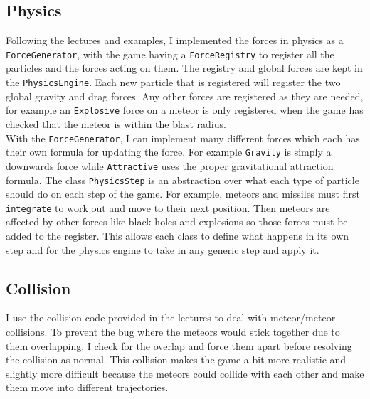 \documentclass{article}
\newcommand{\n}[0]{\\[\baselineskip]}
\begin{document}
\subsection{Physics}
Following the lectures and examples, I implemented the forces in physics as a \texttt{ForceGenerator}, with the game having a \texttt{ForceRegistry} to register all the particles and the forces acting on them. The registry and global forces are kept in the \texttt{PhysicsEngine}. Each new particle that is registered will register the two global gravity and drag forces. Any other forces are registered as they are needed, for example an \texttt{Explosive} force on a meteor is only registered when the game has checked that the meteor is within the blast radius. 
\n
With the \texttt{ForceGenerator}, I can implement many different forces which each has their own formula for updating the force. For example \texttt{Gravity} is simply a downwards force while \texttt{Attractive} uses the proper gravitational attraction formula. 
The class \texttt{PhysicsStep} is an abstraction over what each type of particle should do on each step of the game. For example, meteors and missiles must first \texttt{integrate} to work out and move to their next position. Then meteors are affected by other forces like black holes and explosions so those forces must be added to the register. This allows each class to define what happens in its own step and for the physics engine to take in any generic step and apply it. 

\subsection{Collision}
I use the collision code provided in the lectures to deal with meteor/meteor collisions. To prevent the bug where the meteors would stick together due to them overlapping, I check for the overlap and force them apart before resolving the collision as normal. This collision makes the game a bit more realistic and slightly more difficult because the meteors could collide with each other and make them move into different trajectories. 
\end{document}
